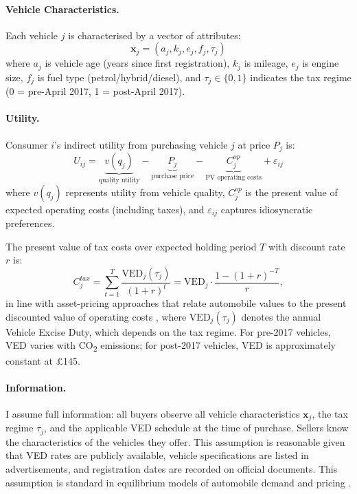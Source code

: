 \documentclass[12pt, a4paper]{article}
\begin{document}
\paragraph{Vehicle Characteristics.}
Each vehicle $j$ is characterised by a vector of attributes:
\begin{equation}
    \mathbf{x}_j = (a_j, k_j, e_j, f_j, \tau_j)
\end{equation}
where $a_j$ is vehicle age (years since first registration), $k_j$ is mileage, $e_j$ is engine size, $f_j$ is fuel type (petrol/hybrid/diesel), and $\tau_j \in \{0,1\}$ indicates the tax regime (0 = pre-April 2017, 1 = post-April 2017).

\paragraph{Utility.}
Consumer $i$'s indirect utility from purchasing vehicle $j$ at price $P_j$ is:
\begin{equation}
    U_{ij} = \underbrace{v(q_j)}_{\text{quality utility}} - \underbrace{P_j}_{\text{purchase price}} - \underbrace{C^{op}_{j}}_{\text{PV operating costs}} +   \varepsilon_{ij}
\end{equation}
where $v(q_j)$ represents utility from vehicle quality, $C^{op}_j$ is the present value of expected operating costs (including taxes), and $\varepsilon_{ij}$ captures idiosyncratic preferences.

The present value of tax costs over expected holding period $T$ with discount rate $r$ is:
\begin{equation}
    C^{tax}_{j} = \sum_{t=1}^{T} \frac{\text{VED}_j(\tau_j)}{(1+r)^t}
    = \text{VED}_j \cdot \frac{1-(1+r)^{-T}}{r},
\end{equation}
in line with asset-pricing approaches that relate automobile values to the present discounted value of operating costs \citep{kahn1986,dreyfusviscusi1995,allcottwozny2014,salleewestfan2016,grigolon2018}, where $\text{VED}_j(\tau_j)$ denotes the annual Vehicle Excise Duty, which depends on the tax regime. For pre-2017 vehicles, VED varies with CO\textsubscript{2} emissions; for post-2017 vehicles, VED is approximately constant at \pounds 145.


\paragraph{Information.}
I assume full information: all buyers observe all vehicle characteristics $\mathbf{x}_j$, the tax regime $\tau_j$, and the applicable VED schedule at the time of purchase. Sellers know the characteristics of the vehicles they offer. This assumption is reasonable given that VED rates are publicly available, vehicle specifications are listed in advertisements, and registration dates are recorded on official documents. This assumption is standard in equilibrium models of automobile demand and pricing \citep{berry1995}.
\end{document}
